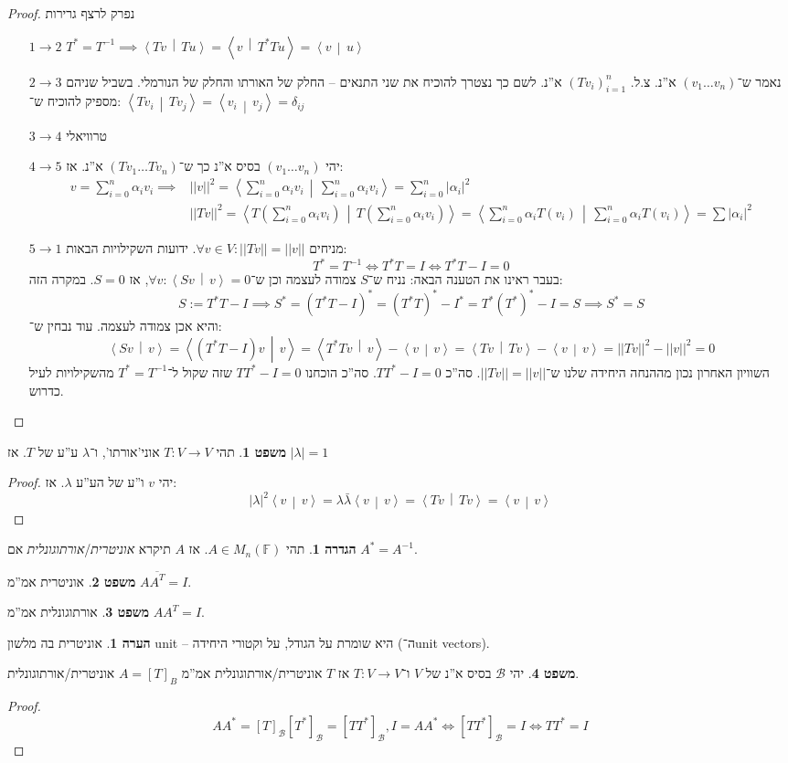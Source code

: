 \documentclass[a4paper]{article}
\newcommand\bc    {\mathcal{B}}
\newcommand\ra    {\rangle}
\newcommand\la    {\langle}
\newcommand\ol    {\overline}
\newcommand\sumni     {\sum_{i = 0}^{n}}
\newcommand\F         {\mathbb{F}}
\newcommand\co        {\colon}
\newcommand\norm[1]   {\left \vert \left \vert #1 \right \vert \right \vert}
\newcommand\mut [2]   {\left \la #1 \,\middle\vert\, #2 \right \ra}
\newcommand\ag        {\alpha}
\newcommand\dg        {\delta}
\renewcommand\lg      {\lambda}
\newcommand\op    {^{-1}}
\newcommand\cl [1]    {\left ( #1 \right )}
\theoremstyle{definition}
\newtheorem{Theorem}{משפט}
\newtheorem{definition}{הגדרה}
\newtheorem{Remark}{הערה}
\newcommand\theo  [1] {\begin{Theorem}#1\end{Theorem}}
\newcommand\defi  [1] {\begin{definition}#1\end{definition}}
\newcommand\rmark [1] {\begin{Remark}#1\end{Remark}}
\begin{document}
	\begin{proof}נפרק לרצף גרירות
		\begin{enumerate}
			\item[$1 \to 2$] \hfil $T^* = T\op \implies \mut{Tv}{Tu} = \mut{v}{T^*Tu} = \mut{v}{u}$
			\item[$2 \to 3$] נאמר ש־$(v_1 \dots v_n)$ א''נ. צ.ל. $(Tv_i)_{i = 1}^{n}$ א''נ. לשם כך נצטרך להוכיח את שני התנאים – החלק של האורתו והחלק של הנורמלי. בשביל שניהם מספיק להוכיח ש־: 
			$\mut{Tv_i}{Tv_j} = \mut{v_i}{v_j}  = \dg_{ij}$
			\item[$3 \to 4$]טרוויאלי
			\item[$4 \to 5$]יהי $(v_1 \dots v_n)$ בסיס א''נ כך ש־$(Tv_1 \dots Tv_n)$ א''נ. אז: 
			\begin{align*}
				v = \sumni \ag_i v_i \implies &\norm{v}^2 = \mut{\sumni \ag_i v_i}{\sumni \ag_i v_i} = \sumni |\ag_i|^2 \\
				&\norm{Tv}^2 = \mut{T\cl{\sumni \ag_i v_i}}{T\cl{\sumni \ag_i v_i}} = \mut{\sumni \ag_i T(v_i)}{\sumni \ag_i T(v_i)} = \sum |\ag_i|^2
			\end{align*}
			\item[$5 \to 1$]מניחים $\forall v \in V \co \norm{Tv} = \norm{v}$. ידועות השקילויות הבאות: 
			\[ T^* = T\op \iff T^*T = I \iff T^*T - I = 0 \]
			בעבר ראינו את הטענה הבאה: נניח ש־$S$ צמודה לעצמה וכן ש־$\forall v \co \mut{Sv}{v} = 0$, אז $S = 0$. במקרה הזה: 
			\[ S := T^*T - I \implies S^* = (T^*T - I)^* = (T^*T)^* - I^* = T^*(T^*)^* - I =S \implies S^* = S \]
			והיא אכן צמודה לעצמה. עוד נבחין ש־: 
			\[ \mut{Sv}{v} = \mut{(T^* T - I)v}{v} =\mut{T^*Tv}{v} - \mut{v}{v} = \mut{Tv}{Tv} - \mut{v}{v} = \norm{Tv}^2 - \norm{v}^2 = 0 \]
			השוויון האחרון נכון מההנחה היחידה שלנו ש־$\norm{Tv} = \norm{v}$. סה''כ $TT^* - I = 0$. סה''כ הוכחנו $TT^* - I = 0$ שזה שקול ל־$T^* = T\op$ מהשקילויות לעיל כדרוש. 
		\end{enumerate}
	\end{proof}
	
	\theo{תהי $T \co V \to V$ אוני'אורתו', ו־$\lg$ ע''ע של $T$. אז $|\lg| = 1$} \begin{proof}
		יהי $v$ ו''ע של הע''ע $\lg$. אז: 
		\[ |\lg|^2 \mut{v}{v} = \lg\bar\lg \mut{v}{v} = \mut{Tv}{Tv} = \mut{v}{v} \]
	\end{proof}
	\defi{תהי $A \in M_n(\F)$. אז $A$ תיקרא \textit{אוניטרית}/\textit{אורתוגונלית} אם $A^* = A\op$. }
	\theo{אוניטרית אמ''מ $A\ol{A^T} = I$. }
	\theo{אורתוגונלית אמ''מ $AA^T = I$. }
	\rmark{אוניטרית בה מלשון unit – היא שומרת על הגודל, על וקטורי היחידה (ה־unit vectors). }
	\theo{יהי $\bc$ בסיס א''נ של $V$ ו־$T \co V \to V$ אז $T$ אוניטרית/אורתוגונלית אמ''מ $A = [T]_B$ אוניטרית/אורתוגונלית. }
	\begin{proof}
		\[ AA^* = [T]_\bc[T^*]_\bc = [TT^*]_\bc, I = AA^* \iff [TT^*]_\bc = I \iff TT^* = I \]
	\end{proof}
	
\end{document}
